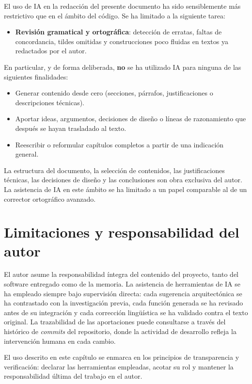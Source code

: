 El uso de IA en la redacción del presente documento ha sido sensiblemente más restrictivo que en el ámbito del código. Se ha limitado a la siguiente tarea:

\begin{itemize}
    \item \textbf{Revisión gramatical y ortográfica}: detección de erratas, faltas de concordancia, tildes omitidas y construcciones poco fluidas en textos ya redactados por el autor.
\end{itemize}

En particular, y de forma deliberada, \textbf{no} se ha utilizado IA para ninguna de las siguientes finalidades:

\begin{itemize}
    \item Generar contenido desde cero (secciones, párrafos, justificaciones o descripciones técnicas).
    \item Aportar ideas, argumentos, decisiones de diseño o líneas de razonamiento que después se hayan trasladado al texto.
    \item Reescribir o reformular capítulos completos a partir de una indicación general.
\end{itemize}

La estructura del documento, la selección de contenidos, las justificaciones técnicas, las decisiones de diseño y las conclusiones son obra exclusiva del autor. La asistencia de IA en este ámbito se ha limitado a un papel comparable al de un corrector ortográfico avanzado.

\section{Limitaciones y responsabilidad del autor}\label{sec:ia-limitaciones}

El autor asume la responsabilidad íntegra del contenido del proyecto, tanto del software entregado como de la memoria. La asistencia de herramientas de IA se ha empleado siempre bajo supervisión directa: cada sugerencia arquitectónica se ha contrastado con la investigación previa, cada función generada se ha revisado antes de su integración y cada corrección lingüística se ha validado contra el texto original. La trazabilidad de las aportaciones puede consultarse a través del histórico de \textit{commits} del repositorio, donde la actividad de desarrollo refleja la intervención humana en cada cambio.

El uso descrito en este capítulo se enmarca en los principios de transparencia y verificación: declarar las herramientas empleadas, acotar su rol y mantener la responsabilidad última del trabajo en el autor.
